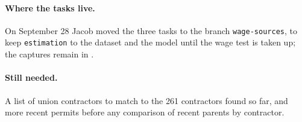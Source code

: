 \paragraph{Where the tasks live.} On September 28 Jacob moved the three tasks
to the branch \texttt{wage-sources}, to keep \texttt{estimation} to the
dataset and the model until the wage test is taken up; the captures remain in
.

\paragraph{Still needed.} A list of union contractors to match to the 261
contractors found so far, and more recent permits before any comparison of
recent parents by contractor.

